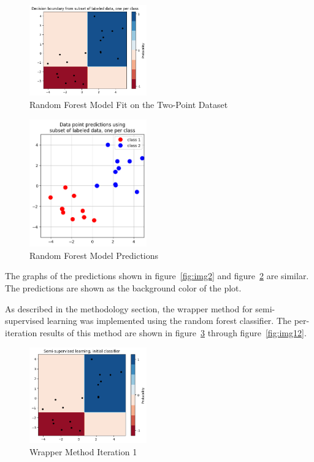 \begin{figure}[H]
    \centering
    \includegraphics[width=0.45\textwidth]{images/img3.png}
    \caption{Random Forest Model Fit on the Two-Point Dataset}
    \label{fig:img3}
\end{figure}

\begin{figure}[H]
    \centering
    \includegraphics[width=0.45\textwidth]{images/img4.png}
    \caption{Random Forest Model Predictions}
    \label{fig:img4}
\end{figure}

The graphs of the predictions shown in figure~\ref{fig:img2} and figure~\ref{fig:img4} are similar. The predictions are shown as the background color of the plot. 

As described in the methodology section, the wrapper method for semi-supervised learning was implemented using the random forest classifier. The per-iteration results of this method are shown in figure~\ref{fig:img5} through figure~\ref{fig:img12}.  

\begin{figure}[H]
    \centering
    \includegraphics[width=0.45\textwidth]{images/img5.png}
    \caption{Wrapper Method Iteration 1}
    \label{fig:img5}
\end{figure}

